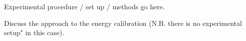 Experimental procedure / set up / methods go here.

Discuss the approach to the energy calibration (N.B. there is no experimental setup" in this case).
